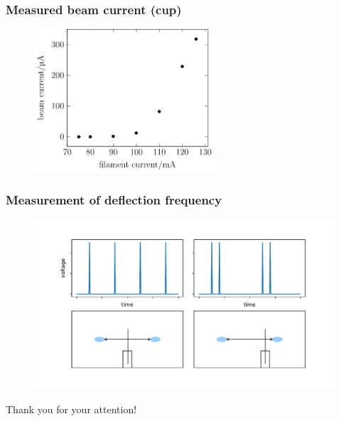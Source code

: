 \documentclass[aspectratio=169]{beamer}
\begin{document}

\begin{frame}
	\frametitle{Measured beam current (cup)}
	\begin{figure}[h]
		\centering
		\includegraphics[width=0.6\textwidth]{../Figures/Thesis-figure5.pdf}
	\end{figure}
\end{frame}

\begin{frame}
	\frametitle{Measurement of deflection frequency}
	\begin{figure}
		\centering
		\includegraphics[width=0.8\linewidth]{../Chapters/beam-characterization/Spikes}
	\end{figure}
\end{frame}


\begin{frame}
\Huge{\centerline{Thank you for your attention!}}
\end{frame}

\end{document}
